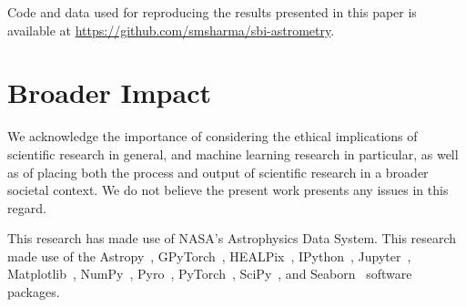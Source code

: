 \documentclass[]{article}
\begin{document}
Code and data used for reproducing the results presented in this paper is available at \url{https://github.com/smsharma/sbi-astrometry}.

\section*{Broader Impact}
\label{sec:impact}


We acknowledge the importance of considering the ethical implications of scientific research in general, and machine learning research in particular, as well as of placing both the process and output of scientific research in a broader societal context. We do not believe the present work presents any issues in this regard. 

\begin{ack}
This research has made use of NASA's Astrophysics Data System. This research made use of the Astropy~\cite{Robitaille:2013mpa,Price-Whelan:2018hus},
GPyTorch~\cite{gardner2018gpytorch},
HEALPix~\cite{Gorski:2004by,Zonca2019},
IPython~\cite{PER-GRA:2007},
Jupyter~\cite{Kluyver2016JupyterN},
Matplotlib~\cite{Hunter:2007},
NumPy~\cite{harris_array_2020},
Pyro~\cite{bingham2019pyro},
PyTorch~\cite{NEURIPS2019_9015},
SciPy~\cite{2020SciPy-NMeth}, and
Seaborn~\cite{michael_waskom_2017_883859}
software packages.
\end{ack}



\end{document}
